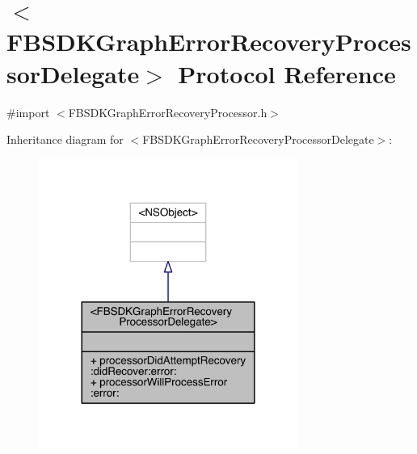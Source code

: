 \hypertarget{protocol_f_b_s_d_k_graph_error_recovery_processor_delegate-p}{\section{$<$F\-B\-S\-D\-K\-Graph\-Error\-Recovery\-Processor\-Delegate$>$ Protocol Reference}
\label{protocol_f_b_s_d_k_graph_error_recovery_processor_delegate-p}
}


{\ttfamily \#import $<$F\-B\-S\-D\-K\-Graph\-Error\-Recovery\-Processor.\-h$>$}



Inheritance diagram for $<$F\-B\-S\-D\-K\-Graph\-Error\-Recovery\-Processor\-Delegate$>$\-:
\nopagebreak
\begin{figure}[H]
\begin{center}
\leavevmode
\includegraphics[width=240pt]{protocol_f_b_s_d_k_graph_error_recovery_processor_delegate-p__inherit__graph}
\end{center}
\end{figure}


